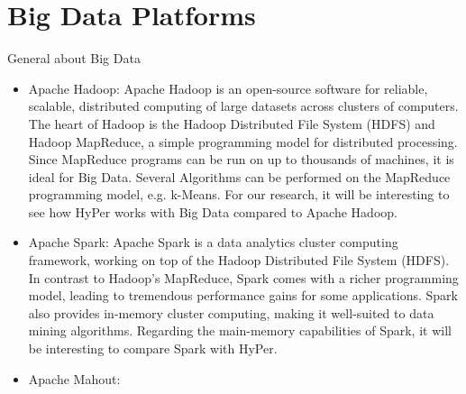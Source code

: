 \section{Big Data Platforms}
General about Big Data
\begin{itemize}
\item Apache Hadoop: Apache Hadoop is an open-source software for reliable, scalable, distributed computing of large datasets across clusters of computers. The heart of Hadoop is the Hadoop Distributed File System (HDFS) and Hadoop MapReduce, a simple programming model for distributed processing. Since MapReduce programs can be run on up to thousands of machines, it is ideal for Big Data. Several Algorithms can be performed on the MapReduce programming model, e.g. k-Means. For our research, it will be interesting to see how HyPer works with Big Data compared to Apache Hadoop.

\item Apache Spark: Apache Spark is a data analytics cluster computing framework, working on top of the Hadoop Distributed File System (HDFS). In contrast to Hadoop’s MapReduce, Spark comes with a richer programming model, leading to tremendous performance gains for some applications. Spark also provides in-memory cluster computing, making it well-suited to data mining algorithms. Regarding the main-memory capabilities of Spark, it will be interesting to compare Spark with HyPer.

\item Apache Mahout:
\end{itemize}

